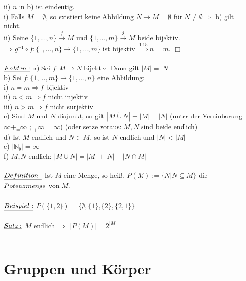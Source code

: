 \documentclass[fleqn, a4paper, 11pt]{article}
\begin{document}
ii) $n$ in b) ist eindeutig.\\
i) Falls $M=\emptyset$, so existiert keine Abbildung $N\rightarrow M=\emptyset$ f\"ur $N\neq\emptyset\Rightarrow$ b) gilt nicht.\\
ii) Seine $\{1,...,n\}\stackrel{f}{\rightarrow} M$ und $\{1,...,m\}\stackrel{g}{\rightarrow} M$ beide bijektiv. $\Rightarrow g^{-1}\circ f:\{1,...,n\}\rightarrow\{1,...,m\}$ ist bijektiv $\stackrel{1.15}{\Rightarrow} n=m$. \hfill $\Box$\\
\\
$\uline{Fakten:}$ a) Sei $f:M\rightarrow N$ bijektiv. Dann gilt $|M|=|N|$\\
b) Sei $f:\{1,...,m\}\rightarrow\{1,...,n\}$ eine Abbildung:\\
i) $n=m\Rightarrow f$ bijektiv\\
ii) $n<m\Rightarrow f$ nicht injektiv\\
iii) $n>m\Rightarrow f$ nicht surjektiv\\
c) Sind $M$ und $N$ disjunkt, so gilt $|M\mathbin{\dot{\cup}}N|=|M|+|N|$ (unter der Vereinbarung $\infty+_=\infty$ ; $_+\infty=\infty$) (oder setze voraus: $M,N$ sind beide endlich)\\
d) Ist $M$ endlich und $N\subset M$, so ist $N$ endlich und $|N|<|M|$\\
e) $|\mathbb{N}_{0}|=\infty$\\
f) $M,N$ endlich: $|M\cup N|=|M|+|N|-|N\cap M|$\\
\\
$\uline{Definition:}$ Ist $M$ eine Menge, so hei\ss{}t $P(M):=\{N|N\subseteq M\}$ die $\uline{Potenzmenge}$ von $M$.\\
\\
$\uline{Beispiel:}$ $P(\{1,2\})=\{\emptyset,\{1\},\{2\},\{2,1\}\}$\\
\\
$\uline{Satz:}$ $M$ endlich $\Rightarrow$ $|P(M)|=2^{|M|}$\\
\\
\newpage
\section{Gruppen und K\"orper}
\end{document}
